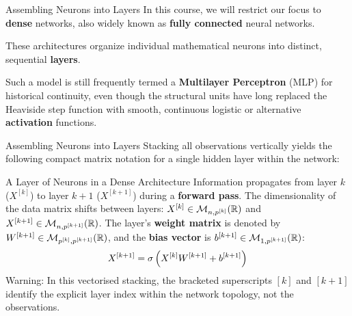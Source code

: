 \begin{frame}{Assembling Neurons into Layers}
	In this course, we will restrict our focus to \textbf{dense} networks, also widely known as \textbf{fully connected} neural networks.
	
	\vspace{0.3cm}
	
	These architectures organize individual mathematical neurons into distinct, sequential \textbf{layers}.
	
	\vspace{0.3cm}
	
	Such a model is still frequently termed a \textbf{Multilayer Perceptron} (MLP) for historical continuity, even though the structural units have long replaced the Heaviside step function with smooth, continuous logistic or alternative \textbf{activation} functions.
\end{frame}

\begin{frame}{Assembling Neurons into Layers}
	Stacking all observations vertically yields the following compact matrix notation for a single hidden layer within the network:
	
	\begin{block}{A Layer of Neurons in a Dense Architecture}
		Information propagates from layer $k$ ($X^{[k]}$) to layer $k+1$ ($X^{[k+1]}$) during a \textbf{forward pass}. The dimensionality of the data matrix shifts between layers: $X^{[k]} \in \mathcal{M}_{n,p^{[k]}}(\mathbb{R})$ and $X^{[k+1]} \in \mathcal{M}_{n,p^{[k+1]}}(\mathbb{R})$. The layer's \textbf{weight matrix} is denoted by $W^{[k+1]} \in \mathcal{M}_{p^{[k]},p^{[k+1]}}(\mathbb{R})$, and the \textbf{bias vector} is $b^{[k+1]} \in \mathcal{M}_{1,p^{[k+1]}}(\mathbb{R})$:
		\begin{equation*}
			X^{[k+1]} = \operatorname{\sigma}\left(X^{[k]} W^{[k+1]} + b^{[k+1]}\right)
		\end{equation*}
		Warning: In this vectorised stacking, the bracketed superscripts $[k]$ and $[k+1]$ identify the explicit layer index within the network topology, not the observations.
	\end{block}
\end{frame}

